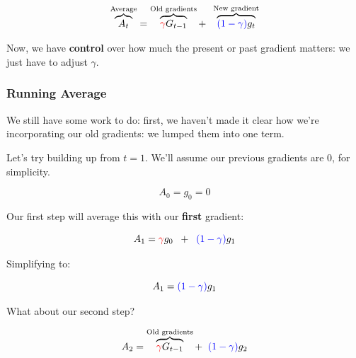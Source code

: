             \begin{equation}
                \overbrace{
                    A_t 
                }^{\text{Average}}
                =
                \overbrace{
                    \textcolor{red}{\gamma} G_{t-1}
                }^{\text{Old gradients}}
                + \;\;
                \overbrace{
                    \textcolor{blue}{(1-\gamma)} g_{t}
                }^{\text{New gradient}}
            \end{equation}
            
            Now, we have \textbf{control} over how much the present or past gradient matters: we just have to adjust $\gamma$. 
            
        \phantom{}
        
        \subsubsection{Running Average}
        
            We still have some work to do: first, we haven't made it clear how we're incorporating our old gradients: we lumped them into one term.
            
            Let's try building up from $t=1$. We'll assume our previous gradients are 0, for simplicity.
            
            \begin{equation}
                A_0=g_0=0
            \end{equation}
            
            Our first step will average this with our \textbf{first} gradient:
            
            \begin{equation}
                A_1 
                =  
                \textcolor{red}{\gamma} g_0 \;\;+\;\; \textcolor{blue}{(1-\gamma)} g_1
            \end{equation}
            
            Simplifying to:
            
            \begin{equation}
                A_1 =  \textcolor{blue}{(1-\gamma)} g_1
            \end{equation}
            
            What about our second step? 
            
            \begin{equation}
                A_2
                =
                \overbrace{
                    \textcolor{red}{\gamma} G_{t-1}
                }^{\text{Old gradients}}
                + \;\;
                \textcolor{blue}{(1-\gamma)} g_2
            \end{equation}
            

